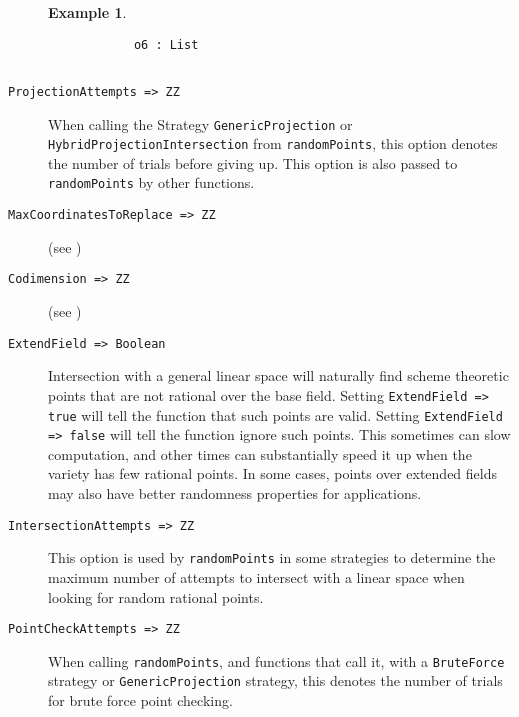 \documentclass[11pt]{amsart}
\theoremstyle{definition}
\newtheorem{example}{Example}[section]
\begin{document}
\begin{description}
\begin{example}
{{\begin{verbatim}
			o6 : List
			
	\end{verbatim}
	}}
	\end{example}
		
	\item[\tt ProjectionAttempts => ZZ] 

	When calling the Strategy {\tt GenericProjection} or \\
	{\tt HybridProjectionIntersection} from {\tt randomPoints}, this option denotes the number of trials before giving up.  This option is also passed to {\tt randomPoints} by other functions.

	\vspace{1em}
	\item[\tt MaxCoordinatesToReplace => ZZ] (see )
	\vspace{1em}
	\item[\tt Codimension => ZZ] (see )

	\vspace{1em}
	\item[\tt ExtendField => Boolean] 

	Intersection with a general linear space will naturally find scheme theoretic points that are not rational over the base field.  
	Setting {\tt ExtendField => true} will tell the function that such points are valid.  Setting {\tt ExtendField => false} will tell the function ignore such points.  This sometimes can slow computation, and other times can substantially speed it up when the variety has few rational points.  In some cases, points over extended fields may also have better randomness properties for applications.

	\vspace{1em}
	\item[\tt IntersectionAttempts => ZZ]

	This option is used by {\tt randomPoints} in some strategies to determine the maximum number of attempts to intersect with a linear space when looking for random rational points.  %

	\vspace{1em}
	\item[\tt PointCheckAttempts => ZZ]

	When calling {\tt randomPoints}, and functions that call it, with a {\tt BruteForce} strategy or {\tt GenericProjection} strategy, this denotes the number of trials for brute force point checking.
	

\end{description}
\end{document}

